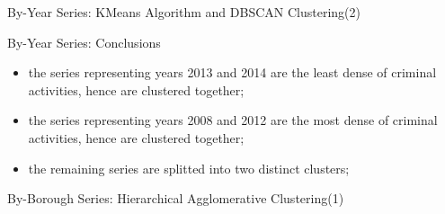\documentclass[12pt]{beamer}
\begin{document}
        \begin{frame}{By-Year Series: KMeans Algorithm and DBSCAN Clustering(2)}
            \begin{figure}
                \centering
            \end{figure}
        \end{frame}

        \begin{frame}{By-Year Series: Conclusions}
            \begin{itemize}
                \item the series representing years 2013 and 2014 are the least dense of criminal
                activities, hence are clustered together;
                \item the series representing years 2008 and 2012 are the most dense of criminal activities,
                hence are clustered together;
                \item the remaining series are splitted into two distinct clusters;
            \end{itemize}
        \end{frame}

        \begin{frame}{By-Borough Series: Hierarchical Agglomerative Clustering(1)}
            \begin{figure}
                \centering
            \end{figure}
        \end{frame}
\end{document}
